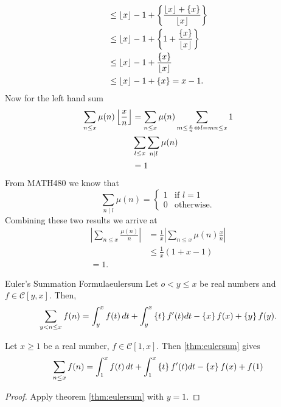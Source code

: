 \documentclass[twoside, openright, fontsize=10pt, headings=big]{scrbook}
\begin{document}
\begin{example}{}{}
\begin{enumerate}
\begin{align*}
            &\leq\left\lfloor x \right\rfloor-1+\left\{\frac{\left\lfloor x \right\rfloor+\{x\}}{\left\lfloor x \right\rfloor}\right\}\\
            &\leq \left\lfloor x \right\rfloor-1+\left\{1+\frac{\{x\}}{\left\lfloor x \right\rfloor} \right\}\\
            &\leq \left\lfloor x \right\rfloor-1+\frac{\left\{ x \right\}}{\left\lfloor x \right\rfloor}\\
            &\leq \left\lfloor x \right\rfloor-1+\left\{ x \right\}=x-1.
        \end{align*}
        Now for the left hand sum
        \begin{align*}
            \sum_{n\leq x}\mu(n)\left\lfloor \frac{x}{n} \right\rfloor&=\sum_{n\leq x}\mu(n)\sum_{m\leq \frac{x}{n}\Leftrightarrow l=mn\leq x}1\\
            &\sum_{l\leq x}\sum_{n\mid l}\mu(n)\\
            &=1
        \end{align*}
        From MATH480 we know that 
        \[
            \sum_{n\mid l}\mu(n)=
            \begin{cases}
                1& \text{if } l=1\\
                0& \text{otherwise}.
            \end{cases}
        \]
        Combining these two results we arrive at
        \begin{align*}
            \left|\sum_{n\leq x}\frac{\mu(n)}{n}\right|&=\frac{1}{x}\left|\sum_{n\leq x}\mu(n)\frac{x}{n}\right|\\
            &\leq \frac{1}{x}(1+x-1)\\
            =1.
        \end{align*}
    \end{enumerate}
\end{example}
\begin{theorem}{Euler's Summation Formula}{eulersum}
    Let $o<y\leq x$ be real numbers and $f\in\mathcal{C}[y,x]$. Then,
    \[
        \sum_{y<n\leq x}f(n)=\int_{y}^{x}f(t)\,dt+\int_{y}^{x}\left\{ t \right\}f'(t)dt-\left\{ x \right\}f(x)+\left\{ y \right\}f(y).
    \]
\end{theorem}
\begin{corollary}{}{}
    Let $x\geq 1$ be a real number, $f\in\mathcal{C}[1,x]$. Then \ref{thm:eulersum} gives
    \[
        \sum_{n\leq x}f(n)=\int_{1}^{x}f(t)\,dt+\int_{1}^{x}\left\{ t \right\}f'(t)dt-\left\{ x \right\}f(x)+f(1)
    \]
\end{corollary}
\begin{proof}
    Apply theorem \ref{thm:eulersum} with $y=1$.
\end{proof}
\end{document}
